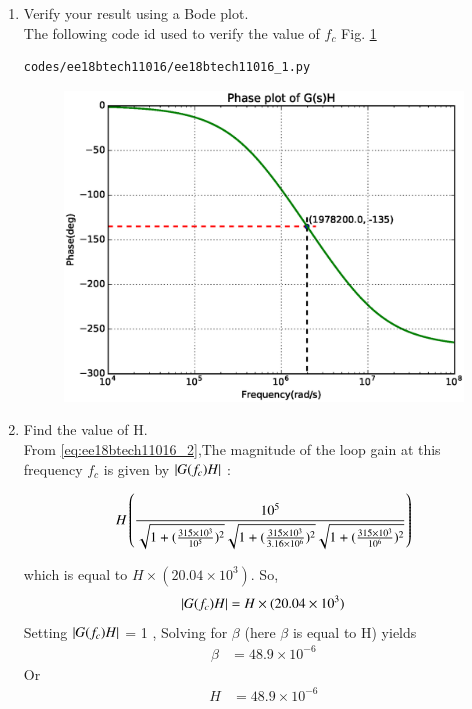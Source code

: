 \begin{enumerate}[label=\arabic*.,ref=\theenumi]
\item Verify your result using a Bode plot.
\\
\solution  The following code  id used to verify the value of $f_{c}$ Fig. \ref{fig:ee18btech11016_1}

\begin{lstlisting}
codes/ee18btech11016/ee18btech11016_1.py
\end{lstlisting}
%
\begin{figure}[!h]
\centering
\includegraphics[width=\columnwidth]{./figs/ee18btech11016/ee18btech11016_resultbode.eps}
\caption{}
\label{fig:ee18btech11016_1}
\end{figure}

\item Find the value of H.\\
\solution From \eqref{eq:ee18btech11016_2},The magnitude of the loop gain at this frequency $f_{c}$ is given by $\left\vert G(f_{c})H\right\vert$ :
 
\begin{align}
    H\left(\frac{10^5}{\sqrt{1+(\frac{315\times10^3}{10^5})^2}\sqrt{1+(\frac{315\times10^3}{3.16\times10^6})^2}\sqrt{1+(\frac{315\times10^3}{10^6})^2}}\right)
\end{align}

which is equal to $H\times(20.04\times10^3)$.
So,
\begin{align}
\left\vert G(f_{c})H\right\vert = H\times(20.04\times10^3)
\end{align}
Setting $\left\vert G(f_{c})H\right\vert$ = 1 , Solving for $\beta$ (here $\beta$ is equal to H) yields 
\begin{align}
\beta &= 48.9\times10^{-6}
\end{align}
Or
\begin{align}
H &= 48.9\times10^{-6}
\end{align}


\end{enumerate}

